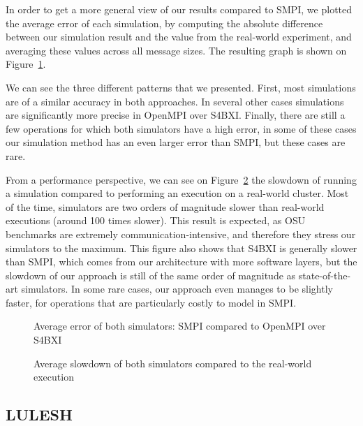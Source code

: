 In order to get a more general view of our results compared to SMPI, we plotted
the average error of each simulation, by computing the absolute difference
between our simulation result and the value from the real-world experiment, and
averaging these values across all message sizes. The resulting graph is shown on
Figure~\ref{fig:5_high_level:osu_errors}.

We can see the three different patterns that we presented. First, most
simulations are of a similar accuracy in both approaches. In several other cases
simulations are significantly more precise in OpenMPI over S4BXI. Finally, there
are still a few operations for which both simulators have a high error, in some
of these cases our simulation method has an even larger error than SMPI, but
these cases are rare.

From a performance perspective, we can see on
Figure~\ref{fig:5_high_level:osu_perf} the slowdown of running a simulation
compared to performing an execution on a real-world cluster. Most of the time,
simulators are two orders of magnitude slower than real-world executions (around
100 times slower). This result is expected, as OSU benchmarks are extremely
communication-intensive, and therefore they stress our simulators to the
maximum. This figure also shows that S4BXI is generally slower than SMPI, which
comes from our architecture with more software layers, but the slowdown of our
approach is still of the same order of magnitude as state-of-the-art simulators.
In some rare cases, our approach even manages to be slightly faster, for
operations that are particularly costly to model in SMPI.

\begin{figure}[!hb]
    \centering
    \caption{Average error of both simulators: SMPI compared to OpenMPI over S4BXI}
    \label{fig:5_high_level:osu_errors}
\end{figure}

\begin{figure}[!hb]
    \centering
    \caption{Average slowdown of both simulators compared to the real-world execution}
    \label{fig:5_high_level:osu_perf}
\end{figure}

\subsection{LULESH}

